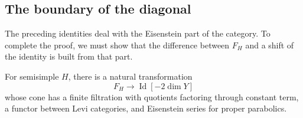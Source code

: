 \subsection{The boundary of the diagonal}

The preceding identities deal with the Eisenstein part of the category.
To complete the proof, we must show that the difference between $F_H$ and
a shift of the identity is built from that part.

\begin{proposition}\label{pseudo:boundary-factorization}
For semisimple $H$, there is a natural transformation
\[
 F_H\longrightarrow\operatorname{Id}[-2\dim Y]
\]
whose cone has a finite filtration with quotients factoring through constant
term, a functor between Levi categories, and Eisenstein series for proper
parabolics.
\end{proposition}

